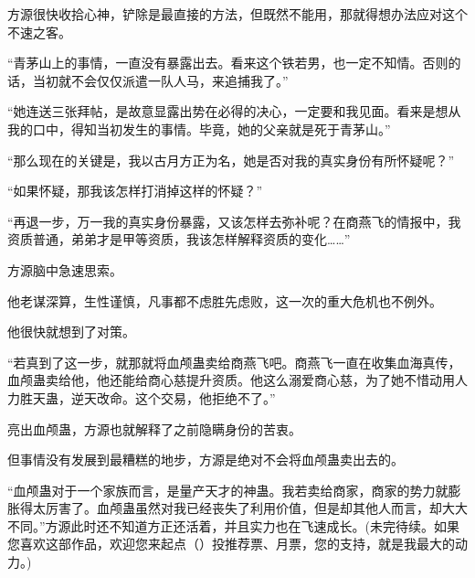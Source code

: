 \begin{this_body}
方源很快收拾心神，铲除是最直接的方法，但既然不能用，那就得想办法应对这个不速之客。

“青茅山上的事情，一直没有暴露出去。看来这个铁若男，也一定不知情。否则的话，当初就不会仅仅派遣一队人马，来追捕我了。”

“她连送三张拜帖，是故意显露出势在必得的决心，一定要和我见面。看来是想从我的口中，得知当初发生的事情。毕竟，她的父亲就是死于青茅山。”

“那么现在的关键是，我以古月方正为名，她是否对我的真实身份有所怀疑呢？”

“如果怀疑，那我该怎样打消掉这样的怀疑？”

“再退一步，万一我的真实身份暴露，又该怎样去弥补呢？在商燕飞的情报中，我资质普通，弟弟才是甲等资质，我该怎样解释资质的变化……”

方源脑中急速思索。

他老谋深算，生性谨慎，凡事都不虑胜先虑败，这一次的重大危机也不例外。

他很快就想到了对策。

“若真到了这一步，就那就将血颅蛊卖给商燕飞吧。商燕飞一直在收集血海真传，血颅蛊卖给他，他还能给商心慈提升资质。他这么溺爱商心慈，为了她不惜动用人力胜天蛊，逆天改命。这个交易，他拒绝不了。”

亮出血颅蛊，方源也就解释了之前隐瞒身份的苦衷。

但事情没有发展到最糟糕的地步，方源是绝对不会将血颅蛊卖出去的。

“血颅蛊对于一个家族而言，是量产天才的神蛊。我若卖给商家，商家的势力就膨胀得太厉害了。血颅蛊虽然对我已经丧失了利用价值，但是却其他人而言，却大大不同。”方源此时还不知道方正还活着，并且实力也在飞速成长。(未完待续。如果您喜欢这部作品，欢迎您来起点（）投推荐票、月票，您的支持，就是我最大的动力。)

\end{this_body}

